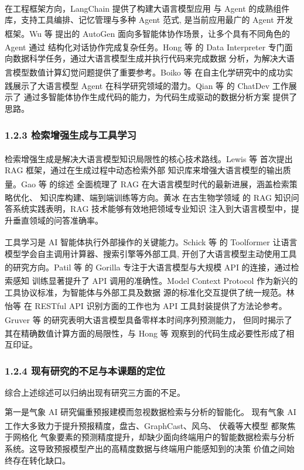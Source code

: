 \documentclass[a4paper]{article}
\theoremstyle{definition}
\theoremstyle{plain}
\theoremstyle{remark}
\let\oldcite\cite
\renewcommand{\cite}[1]{\textsuperscript{\oldcite{#1}}}
\begin{document}
在工程框架方向，LangChain \cite{ref15} 提供了构建大语言模型应用
与 Agent 的成熟组件库，支持工具编排、记忆管理与多种 Agent 范式,
是当前应用最广的 Agent 开发框架。Wu 等 \cite{ref19} 提出的
AutoGen 面向多智能体协作场景，让多个具有不同角色的 Agent 通过
结构化对话协作完成复杂任务。Hong 等 \cite{ref20} 的 Data Interpreter
专门面向数据科学任务，通过大语言模型生成并执行代码来完成数据
分析，为解决大语言模型数值计算幻觉问题提供了重要参考。Boiko 等
\cite{ref23} 在自主化学研究中的成功实践展示了大语言模型 Agent
在科学研究领域的潜力。Qian 等 \cite{ref29} 的 ChatDev 工作展示了
通过多智能体协作生成代码的能力，为代码生成驱动的数据分析方案
提供了思路。

\subsubsection*{1.2.3 \quad 检索增强生成与工具学习}

检索增强生成是解决大语言模型知识局限性的核心技术路线。Lewis 等
\cite{ref12} 首次提出 RAG 框架，通过在生成过程中动态检索外部
知识库来增强大语言模型的输出质量。Gao 等 \cite{ref24} 的综述
全面梳理了 RAG 在大语言模型时代的最新进展，涵盖检索策略优化、
知识库构建、端到端训练等方向。黄冰 \cite{ref4} 在古生物学领域
的 RAG 知识问答系统实践表明，RAG 技术能够有效地把领域专业知识
注入到大语言模型中，提升垂直领域的问答准确率。

工具学习是 AI 智能体执行外部操作的关键能力。Schick 等 \cite{ref21}
的 Toolformer 让语言模型学会自主调用计算器、搜索引擎等外部工具,
开创了大语言模型主动使用工具的研究方向。Patil 等 \cite{ref28}
的 Gorilla 专注于大语言模型与大规模 API 的连接，通过检索感知
训练显著提升了 API 调用的准确性。Model Context Protocol
\cite{ref11} 作为新兴的工具协议标准，为智能体与外部工具及数据
源的标准化交互提供了统一规范。林怡等 \cite{ref3} 在 RESTful API
识别方面的工作也为 API 工具封装提供了方法论参考。Gruver 等
\cite{ref22} 的研究表明大语言模型具备零样本时间序列预测能力，
但同时揭示了其在精确数值计算方面的局限性，与 Hong 等 \cite{ref20}
观察到的代码生成必要性形成了相互印证。

\subsubsection*{1.2.4 \quad 现有研究的不足与本课题的定位}

综合上述综述可以归纳出现有研究三方面的不足。

第一是气象 AI 研究偏重预报建模而忽视数据检索与分析的智能化。
现有气象 AI 工作大多致力于提升预报精度，盘古、GraphCast、风乌、
伏羲等大模型 \cite{ref16, ref17, ref26, ref27} 都聚焦于网格化
气象要素的预测精度提升，却缺少面向终端用户的智能数据检索与分析
系统。这导致预报模型产出的高精度数据与终端用户能感知到的决策
价值之间始终存在转化缺口。
\end{document}
